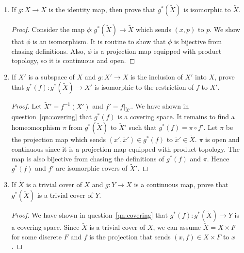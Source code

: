 \documentclass{article}
\begin{document}
\begin{enumerate}
\begin{enumerate}
      \item If $g:X\rightarrow X$ is the identity map, then prove that
        $g^*(\tilde{X})$ is isomorphic to $\tilde{X}$.
        \begin{proof}
          Consider the map $\phi:g^*(\tilde{X})\rightarrow\tilde{X}$ which
          sends $(x,p)$ to $p$. We show that $\phi$ is an isomorphism.
          It is routine to show that $\phi$ is bijective from chasing
          definitions. Also, $\phi$ is a projection map equipped with
          product topology, so it is continuous and open.
        \end{proof}

      \item If $X'$ is a subspace of $X$ and $g:X'\rightarrow X$ is the
        inclusion of $X'$ into $X$, prove that
        $g^*(f):g^*(\tilde{X})\rightarrow X'$ is isomorphic to the
        restriction of $f$ to $X'$.

        \begin{proof}
          Let $\tilde{X}'=f^{-1}(X')$ and $f'=f|_{\tilde{X}'}$. We have
          shown in question~\ref{qn:covering} that $g^*(f)$ is a covering
          space. It remains to find a homeomorphism $\pi$ from
          $g^*(\tilde{X})$ to $\tilde{X}'$ such that $g^*(f)=\pi\circ f'$.
          Let $\pi$ be the projection map which sends $(x',\tilde{x}')\in
          g^*(f)$ to $\tilde{x}'\in\tilde{X}$. $\pi$ is open and continuous
          since it is a projection map equipped with product topology. The
          map is also bijective from chasing the definitions of $g^*(f)$
          and $\pi$. Hence $g^*(f)$ and $f'$ are isomorphic covers of
          $\tilde{X}'$.
        \end{proof}

      \item If $\tilde{X}$ is a trivial cover of $X$ and $g:Y\rightarrow X$
        is a continuous map, prove that $g^*(\tilde{X})$ is a trivial cover
        of $Y$.

        \begin{proof}
          We have shown in question~\ref{qn:covering} that
          $g^*(f):g^*(\tilde{X})\rightarrow Y$ is a covering space. Since
          $\tilde{X}$ is a trivial cover of $X$, we can assume
          $\tilde{X}=X\times F$ for some discrete $F$ and $f$ is the
          projection that sends $(x,f)\in X\times F$ to $x$.
        \end{proof}
    \end{enumerate}
\end{enumerate}
\end{document}
